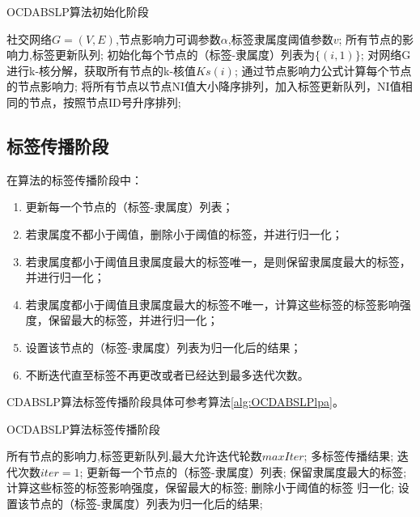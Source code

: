 \begin{algorithm}[h]  
  \caption{OCDABSLP算法初始化阶段}  
  \label{alg:OCDABSLPchushihua} 
  \begin{algorithmic}[1]  
    \Require  
      社交网络$G=(V,E)$,节点影响力可调参数$\alpha$,标签隶属度阈值参数$v$;  
    \Ensure  
      所有节点的影响力,标签更新队列;  
    \State 初始化每个节点的（标签-隶属度）列表为$ \{ (i,1) \} $;  
    \State 对网络G进行k-核分解，获取所有节点的k-核值$Ks(i)$; 
    \State 通过节点影响力公式计算每个节点的节点影响力; 
    \State 将所有节点以节点NI值大小降序排列，加入标签更新队列，NI值相同的节点，按照节点ID号升序排列; 
  \end{algorithmic}  
\end{algorithm}  

\subsection{标签传播阶段}

在算法的标签传播阶段中：
\begin{enumerate}
  \item 更新每一个节点的（标签-隶属度）列表；
  \item 若隶属度不都小于阈值，删除小于阈值的标签，并进行归一化；
  \item 若隶属度都小于阈值且隶属度最大的标签唯一，是则保留隶属度最大的标签，并进行归一化；
  \item 若隶属度都小于阈值且隶属度最大的标签不唯一，计算这些标签的标签影响强度，保留最大的标签，并进行归一化；
  \item 设置该节点的（标签-隶属度）列表为归一化后的结果；
  \item 不断迭代直至标签不再更改或者已经达到最多迭代次数。
\end{enumerate}
CDABSLP算法标签传播阶段具体可参考算法\ref{alg:OCDABSLPlpa}。

\begin{algorithm}[h]  
  \caption{OCDABSLP算法标签传播阶段}  
  \label{alg:OCDABSLPlpa} 
  \begin{algorithmic}[1]  
    \Require  
      所有节点的影响力,标签更新队列,最大允许迭代轮数$maxIter$;  
    \Ensure  
      多标签传播结果;  
    \State 迭代次数$iter=1$;  
    \Repeat  
      \State 更新每一个节点的（标签-隶属度）列表;
          \State 保留隶属度最大的标签;  
        \Else  
          \State 计算这些标签的标签影响强度，保留最大的标签;
        \EndIf
      \Else  
        \State 删除小于阈值的标签
      \EndIf
      \State 归一化;
      \State 设置该节点的（标签-隶属度）列表为归一化后的结果;  
  \end{algorithmic}  
\end{algorithm}

